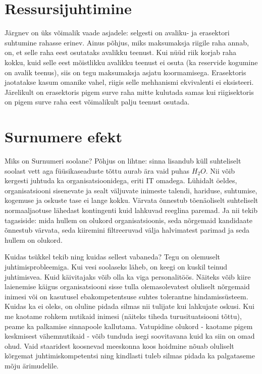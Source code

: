 \documentclass{tufte-book}
\begin{document}
\section{Ressursijuhtimine}
Järgnev on üks võimalik vaade asjadele: selgesti on avaliku- ja erasektori suhtumine rahasse erinev. Ainus põhjus, miks maksumaksja riigile raha annab, on, et selle raha eest osutataks avalikku teenust. Kui nüüd riik korjab raha kokku, kuid selle eest mõistlikku avalikku teenust ei osuta (ka reservide kogumine on avalik teenus), siis on tegu maksumaksja asjatu koormamisega. Erasektoris jaotatakse kasum omanike vahel, riigis selle mehhanismi ekvivalenti ei eksisteeri. Järelikult on erasektoris pigem surve raha mitte kulutada samas kui riigisektoris on pigem surve raha eest võimalikult palju teenust osutada.  

\section{Surnumere efekt}
Miks on Surnumeri soolane? Põhjus on lihtne: sinna lisandub küll suhteliselt soolast vett aga füüsikaseaduste tõttu aurab ära  vaid puhas $H_2O$. Nii võib kergesti juhtuda ka organisatsioonidega, eriti IT omadega. Lühidalt öeldes, organisatsiooni sisenevate ja sealt väljuvate inimeste talendi, hariduse, suhtumise, kogemuse ja oskuste tase ei lange kokku. Värvata õnnestub tõenäoliselt suhteliselt normaaljaotuse lähedast kontingenti kuid lahkuvad reeglina paremad. Ja nii tekib tagasiside: mida hullem on olukord organisatsioonis, seda nõrgemaid kandidaate õnnestub värvata, seda kiiremini filtreeruvad välja halvimatest parimad ja seda hullem on olukord. 

Kuidas tsükkel tekib ning kuidas sellest vabaneda? Tegu on olemuselt juhtimisprobleemiga. Kui vesi soolaseks läheb, on keegi on kuskil teinud juhtimisvea. Kuid käivitajaks võib olla ka viga personalitöös. Näiteks võib kiire laienemise käigus organisatsiooni sisse tulla olemasolevatest oluliselt nõrgemaid inimesi või on kasutusel ebakompetentsuse suhtes tolerantne hindamissüsteem. Kuidas ka ei oleks, on oluline pidada silmas nii tulijate kui lahkujate oskusi. Kui me kaotame rohkem nutikaid inimesi (näiteks tiheda turusituatsiooni tõttu), peame ka palkamise sinnapoole kallutama. Vatupidine olukord - kaotame pigem keskmisest vähemnutikaid - võib tunduda isegi soovitavana kuid ka siin on omad ohud. Vaid staaridest koosnevad meeskonna koos hoidmine nõuab oluliselt kõrgemat juhtimiskompetentsi ning kindlasti tuleb silmas pidada ka palgataseme mõju ärimudelile.
\end{document}
